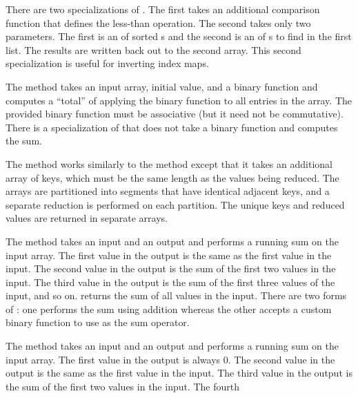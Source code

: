 \begin{description}
  There are two specializations of . The first takes
  an additional comparison function that defines the less-than
  operation. The second takes only two parameters. The first is an
   of sorted s and the second is an
   of s to find in the first list. The
  results are written back out to the second array. This second
  specialization is useful for inverting index maps.
\item[\textcode{Reduce}]  The  method takes
  an input array, initial value, and a binary function and computes a
  ``total'' of applying the binary function to all entries in the array.
  The provided binary function must be associative (but it need not be
  commutative). There is a specialization of  that does
  not take a binary function and computes the sum.
\item[\textcode{ReduceByKey}]  The
   method works similarly to the 
  method except that it takes an additional array of keys, which must be
  the same length as the values being reduced. The arrays are partitioned
  into segments that have identical adjacent keys, and a separate reduction
  is performed on each partition. The unique keys and reduced values are
  returned in separate arrays.
\item[\textcode{ScanInclusive}]  The
   method takes an input and an output
   and performs a running sum on the input
  array. The first value in the output is the same as the first value in
  the input. The second value in the output is the sum of the first two
  values in the input. The third value in the output is the sum of the
  first three values of the input, and so on. 
  returns the sum of all values in the input. There are two forms of
  : one performs the sum using addition whereas the
  other accepts a custom binary function to use as the sum operator.
\item[\textcode{ScanExclusive}]  The
   method takes an input and an output
   and performs a running sum on the input
  array. The first value in the output is always 0. The second value in the
  output is the same as the first value in the input. The third value in
  the output is the sum of the first two values in the input. The fourth

\end{description}
